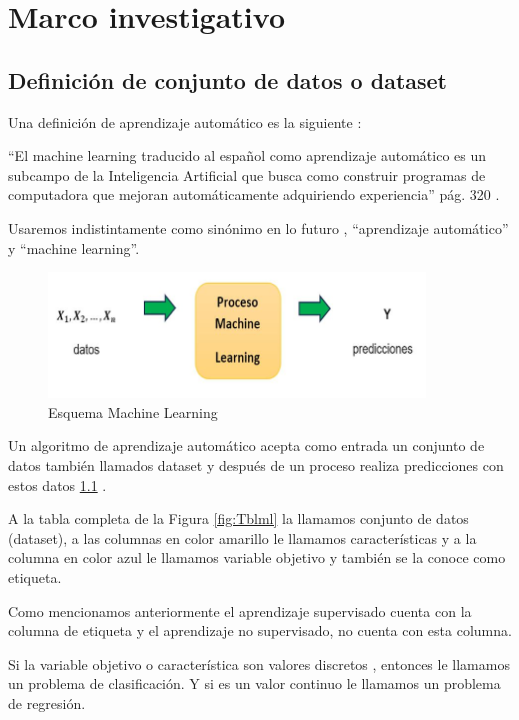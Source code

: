 \chapter{Marco investigativo}\label{cap2:Marco-Investigativo}

\section{Definición de conjunto de datos o dataset}

Una definición de aprendizaje automático es la siguiente : \medskip

“El machine learning traducido al español como aprendizaje automático es un subcampo de la 
Inteligencia Artificial que busca como construir programas de computadora que mejoran 
automáticamente adquiriendo experiencia” \cite{Arang} pág. 320 . \medskip

Usaremos indistintamente como sinónimo en lo futuro , “aprendizaje automático”   y  “machine learning”.

\begin{figure}[ht]
  \centering
  \includegraphics[width=10cm]{Imagenes/EsquemaML.JPG}
  \caption{Esquema Machine Learning}
  \label{fig:EsML}
\end{figure}

Un algoritmo de aprendizaje automático acepta como entrada un conjunto de datos también 
llamados dataset y después de un proceso realiza predicciones con estos datos \ref{fig:EsML} .\medskip



A la tabla completa de la Figura \ref{fig:Tblml}  la llamamos conjunto de datos (dataset), 
a las columnas en color amarillo le llamamos características y a la columna en color azul 
le llamamos variable objetivo y también se la conoce como etiqueta. \medskip

Como mencionamos anteriormente el aprendizaje supervisado cuenta con la columna de etiqueta y 
el aprendizaje no supervisado, no cuenta con esta columna.\medskip

Si la variable objetivo o característica son valores discretos , entonces le llamamos un 
problema de clasificación. Y si es un valor continuo le llamamos un problema de regresión.\medskip



